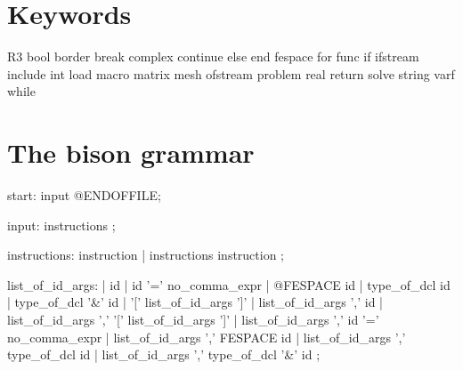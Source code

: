 \documentclass[twoside]{book}
\newif\ifpdf
\begin{document}
\graphicspath{{./}{plots/}}
\ifpdf
\DeclareGraphicsExtensions{.pdf, .jpg, .tif}
\else
{}
\fi

\let\subsubsection\subsection
\let\subsection\section
\let\section\chapter


\subsection{Keywords}
\bFF
      R3  
      bool 
      border 
      break 
      complex 
      continue 
      else
      end 
      fespace
      for 
      func 
      if 
      ifstream 
      include 
      int 
      load      
      macro
      matrix
      mesh 
      ofstream
      problem
      real
      return
      solve
      string 
      varf 
      while

\eFF
\subsection{The bison grammar}

\bFF

start:   input @ENDOFFILE;

input:   instructions ;
         
instructions:  instruction   
        | instructions  instruction   ;

list_of_id_args:   
            | id                      
            | id '=' no_comma_expr   
            | @FESPACE id             
            | type_of_dcl id         
            | type_of_dcl '&' id      
            | '[' list_of_id_args ']' 
            | list_of_id_args ',' id                     
            | list_of_id_args ',' '[' list_of_id_args ']' 
            | list_of_id_args ',' id '=' no_comma_expr  
            | list_of_id_args ',' FESPACE id            
            | list_of_id_args ',' type_of_dcl id        
            | list_of_id_args ',' type_of_dcl '&' id ;    
\end{document}
